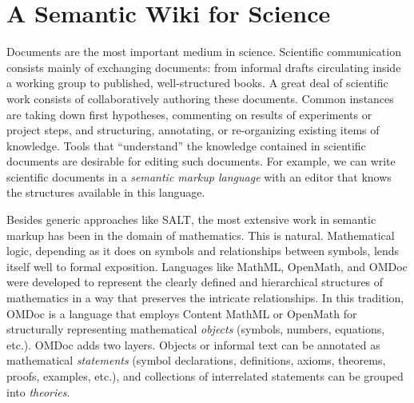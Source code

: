 \section{A Semantic Wiki for Science}
\label{sec:science}

\begin{figure}
  \centering
  \vspace{-.9cm}
  \vspace{-1.2cm}
\end{figure}
Documents are the most important medium in science.
Scientific
communication consists mainly of exchanging documents: from informal drafts circulating
inside a working group to published, well-structured books.  A great deal of scientific
work consists of collaboratively authoring these documents. 
Common instances are taking down first hypotheses,
commenting on results of experiments or project steps, and structuring, annotating,
or re-organizing existing items of knowledge.  Tools that
``understand'' the knowledge contained in scientific documents are desirable for
editing such documents.  For example, we can  write scientific documents in a
\textit{semantic markup language} with an editor that knows the structures available in this
language. 

Besides generic approaches like SALT\cite{Groza:SALT07}, the most
extensive work in semantic markup has been in the domain of
mathematics.  This is natural.  Mathematical logic, depending
as it does on symbols and relationships between symbols, lends itself
well to formal exposition.
Languages like MathML\cite{CarlisleEd:MathML07},
OpenMath\cite{BusCapCar:2oms04}, and OMDoc\cite{Kohlhase:omdoc1.2}
were developed to represent the clearly defined and hierarchical
structures of mathematics in a way that preserves the intricate
relationships.  In this tradition, OMDoc is a language that employs
Content MathML or OpenMath for structurally representing mathematical
\emph{objects} (symbols, numbers, equations, etc.).  OMDoc adds two
layers.  Objects or informal text can be annotated as mathematical
\emph{statements} (symbol declarations, definitions, axioms, theorems,
proofs, examples, etc.), and collections of interrelated statements
can be grouped into \emph{theories}.

